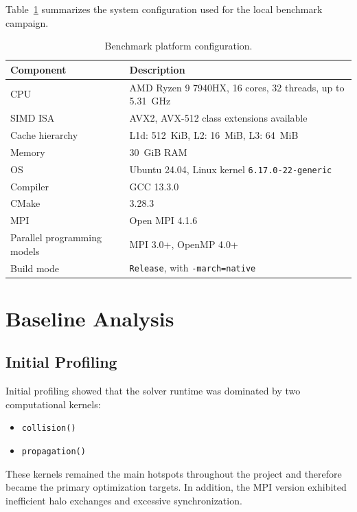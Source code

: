 \documentclass[11pt,a4paper]{article}
\begin{document}
Table~\ref{tab:system-config} summarizes the system configuration used for the local benchmark campaign.

\begin{table}[H]
  \centering
  \caption{Benchmark platform configuration.}
  \label{tab:system-config}
  \begin{tabularx}{\textwidth}{@{}lX@{}}
    \toprule
    Component & Description \\
    \midrule
    CPU & AMD Ryzen 9 7940HX, 16 cores, 32 threads, up to \SI{5.31}{GHz} \\
    SIMD ISA & AVX2, AVX-512 class extensions available \\
    Cache hierarchy & L1d: \SI{512}{KiB}, L2: \SI{16}{MiB}, L3: \SI{64}{MiB} \\
    Memory & \SI{30}{GiB} RAM \\
    OS & Ubuntu 24.04, Linux kernel \texttt{6.17.0-22-generic} \\
    Compiler & GCC 13.3.0 \\
    CMake & 3.28.3 \\
    MPI & Open MPI 4.1.6 \\
    Parallel programming models & MPI 3.0+, OpenMP 4.0+ \\
    Build mode & \texttt{Release}, with \texttt{-march=native} \\
    \bottomrule
  \end{tabularx}
\end{table}

\section{Baseline Analysis}

\subsection{Initial Profiling}

Initial profiling showed that the solver runtime was dominated by two computational kernels:
\begin{itemize}[leftmargin=1.5em]
  \item \texttt{collision()}
  \item \texttt{propagation()}
\end{itemize}

These kernels remained the main hotspots throughout the project and therefore became the primary optimization targets. In addition, the MPI version exhibited inefficient halo exchanges and excessive synchronization.
\end{document}
